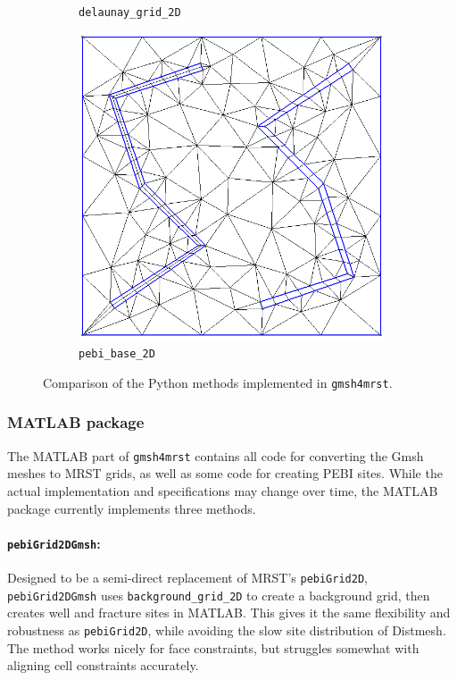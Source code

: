 \begin{figure}[p]
\begin{subfigure}[b]{0.49\textwidth}
        \caption{\texttt{delaunay\_grid\_2D}}
        \label{fig:delaunay_grid_2D}
    \end{subfigure}
    \begin{subfigure}[b]{0.49\textwidth}
        \centering
        \includegraphics[width=\textwidth]{report/Images/Combining software/Demo gmsh4mrst/demo_pebi_base_2D_lines.png}
        \caption{\texttt{pebi\_base\_2D}}
        \label{fig:pebi_base_2D}
    \end{subfigure}
    \caption{Comparison of the Python methods implemented in \texttt{gmsh4mrst}.}
    \label{fig:gmsh4mrst-pymethods}
\end{figure}

\subsubsection{MATLAB package}
The MATLAB part of \verb|gmsh4mrst| contains all code for converting the Gmsh meshes to MRST grids, as well as some code for creating PEBI sites. While the actual implementation and specifications may change over time, the MATLAB package currently implements three methods. 

\paragraph{\texttt{pebiGrid2DGmsh}:}
Designed to be a semi-direct replacement of MRST's \verb|pebiGrid2D|, \verb|pebiGrid2DGmsh| uses \verb|background_grid_2D| to create a background grid, then creates well and fracture sites in MATLAB. This gives it the same flexibility and robustness as \verb|pebiGrid2D|, while avoiding the slow site distribution of Distmesh. The method works nicely for face constraints, but struggles somewhat with aligning cell constraints accurately.


